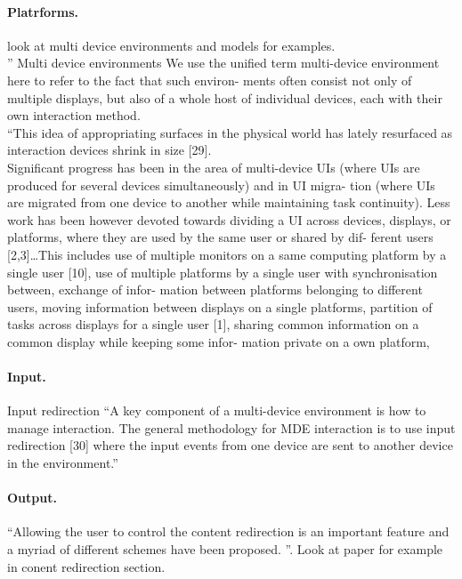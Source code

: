 \paragraph{Platrforms.}
\cite{elmqvist2011distributed} look at multi device environments and models for
examples.\\ 
\cite{elmqvist2011distributed}'' Multi device environments We use
the unified term multi-device environment here to refer to the fact that such
environ- ments often consist not only of multiple displays, but also of a whole
host of individual devices, each with their own interaction method.\\
\cite{elmqvist2011distributed}``This idea of appropriating surfaces in the
physical world has lately resurfaced as interaction devices shrink in size
[29].\\

\cite{vanderdonckt2010distributed}Significant progress has been in the area of
multi-device UIs (where UIs are produced for several devices simultaneously) and
in UI migra- tion (where UIs are migrated from one device to another while
maintaining task continuity). Less work has been however devoted towards
dividing a UI across devices, displays, or platforms, where they are used by the
same user or shared by dif- ferent users [2,3]\ldots This includes use of
multiple monitors on a same computing platform by a single user [10], use of
multiple platforms by a single user with synchronisation between, exchange of
infor- mation between platforms belonging to different users, moving information between displays on a single platforms, partition of tasks across displays for a single user [1], sharing common information on a common display while keeping some infor- mation private on a own platform,\\


\paragraph{Input.} 
\cite{elmqvist2011distributed} Input redirection ``A key component of a
multi-device environment is how to manage interaction.
The general methodology for MDE interaction is to use input redirection [30] where the input events from one device are sent to another device in the environment.''

\paragraph{Output.}
\cite{elmqvist2011distributed} ``Allowing the user to control the content
redirection is an important feature and a myriad of different schemes have been
proposed. ''. Look at paper for example in conent redirection section.

